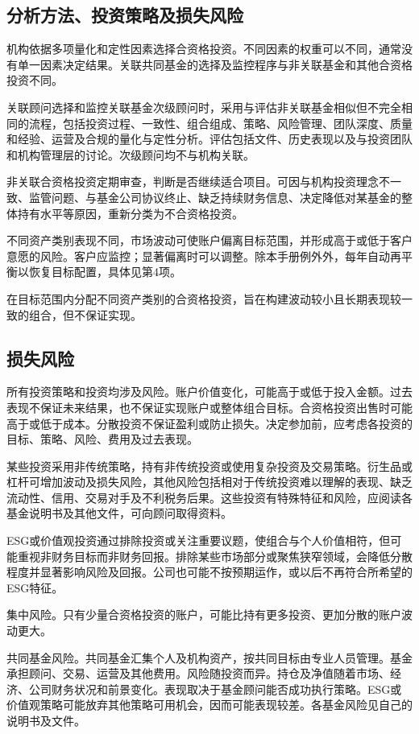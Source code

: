 \documentclass[UTF8,fontset=none,11pt,a4paper]{ctexart}
\begin{document}
\subsection*{分析方法、投资策略及损失风险}
机构依据多项量化和定性因素选择合资格投资。不同因素的权重可以不同，通常没有单一因素决定结果。关联共同基金的选择及监控程序与非关联基金和其他合资格投资不同。


关联顾问选择和监控关联基金次级顾问时，采用与评估非关联基金相似但不完全相同的流程，包括投资过程、一致性、组合组成、策略、风险管理、团队深度、质量和经验、运营及合规的量化与定性分析。评估包括文件、历史表现以及与投资团队和机构管理层的讨论。次级顾问均不与机构关联。


非关联合资格投资定期审查，判断是否继续适合项目。可因与机构投资理念不一致、监管问题、与基金公司协议终止、缺乏持续财务信息、决定降低对某基金的整体持有水平等原因，重新分类为不合资格投资。


不同资产类别表现不同，市场波动可使账户偏离目标范围，并形成高于或低于客户意愿的风险。客户应监控；显著偏离时可以调整。除本手册例外外，每年自动再平衡以恢复目标配置，具体见第4项。


在目标范围内分配不同资产类别的合资格投资，旨在构建波动较小且长期表现较一致的组合，但不保证实现。


\subsection*{损失风险}
所有投资策略和投资均涉及风险。账户价值变化，可能高于或低于投入金额。过去表现不保证未来结果，也不保证实现账户或整体组合目标。合资格投资出售时可能高于或低于成本。分散投资不保证盈利或防止损失。决定参加前，应考虑各投资的目标、策略、风险、费用及过去表现。


某些投资采用非传统策略，持有非传统投资或使用复杂投资及交易策略。衍生品或杠杆可增加波动及损失风险，其他风险包括相对于传统投资难以理解的表现、缺乏流动性、信用、交易对手及不利税务后果。这些投资有特殊特征和风险，应阅读各基金说明书及其他文件，可向顾问取得资料。


ESG或价值观投资通过排除投资或关注重要议题，使组合与个人价值相符，但可能重视非财务目标而非财务回报。排除某些市场部分或聚焦狭窄领域，会降低分散程度并显著影响风险及回报。公司也可能不按预期运作，或以后不再符合所希望的ESG特征。


集中风险。只有少量合资格投资的账户，可能比持有更多投资、更加分散的账户波动更大。


共同基金风险。共同基金汇集个人及机构资产，按共同目标由专业人员管理。基金承担顾问、交易、运营及其他费用。风险随投资而异。持仓及净值随着市场、经济、公司财务状况和前景变化。表现取决于基金顾问能否成功执行策略。ESG或价值观策略可能放弃其他策略可用机会，因而可能表现较差。各基金风险见自己的说明书及文件。
\end{document}

